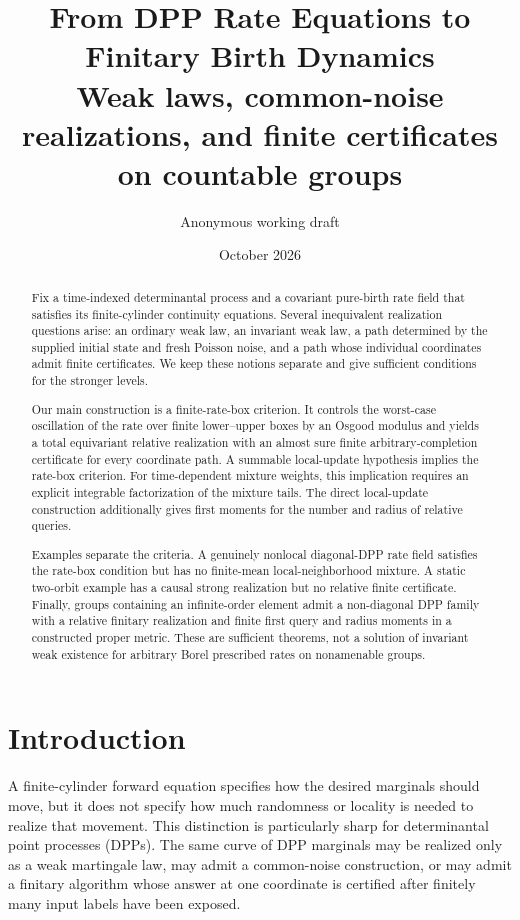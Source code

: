 \documentclass[11pt]{article}
\title{From DPP Rate Equations to Finitary Birth Dynamics\\
\large Weak laws, common-noise realizations, and finite certificates on countable groups}
\author{Anonymous working draft}
\date{October 2026}
\theoremstyle{definition}
\theoremstyle{remark}
\newcommand{\1}{\mathbf{1}}
\begin{document}
\maketitle

\begin{abstract}
Fix a time-indexed determinantal process and a covariant pure-birth rate field
that satisfies its finite-cylinder continuity equations.  Several inequivalent
realization questions arise: an ordinary weak law, an invariant weak law, a
path determined by the supplied initial state and fresh Poisson noise, and a
path whose individual coordinates admit finite certificates.  We keep these
notions separate and give sufficient conditions for the stronger levels.

Our main construction is a finite-rate-box criterion.  It controls the
worst-case oscillation of the rate over finite lower--upper boxes by an Osgood
modulus and yields a total equivariant relative realization with an almost
sure finite arbitrary-completion certificate for every coordinate path.  A
summable local-update hypothesis implies the rate-box criterion.  For
time-dependent mixture weights, this implication requires an explicit
integrable factorization of the mixture tails.  The direct local-update
construction additionally gives first moments for the number and radius of
relative queries.

Examples separate the criteria.  A genuinely nonlocal diagonal-DPP rate field
satisfies the rate-box condition but has no finite-mean local-neighborhood
mixture.  A static two-orbit example has a causal strong realization but no
relative finite certificate.  Finally, groups containing an infinite-order
element admit a non-diagonal DPP family with a relative finitary realization
and finite first query and radius moments in a constructed proper metric.
These are sufficient theorems, not a solution of invariant weak existence for
arbitrary Borel prescribed rates on nonamenable groups.
\end{abstract}

\section{Introduction}

A finite-cylinder forward equation specifies how the desired marginals should
move, but it does not specify how much randomness or locality is needed to
realize that movement.  This distinction is particularly sharp for
determinantal point processes (DPPs).  The same curve of DPP marginals may be
realized only as a weak martingale law, may admit a common-noise construction,
or may admit a finitary algorithm whose answer at one coordinate is certified
after finitely many input labels have been exposed.
\end{document}
